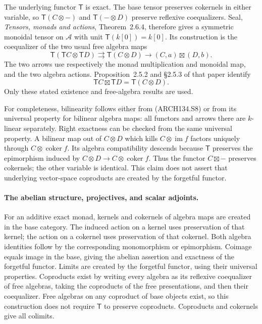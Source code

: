The underlying functor $\mathsf T$ is exact.  The base tensor
preserves cokernels in either variable, so
$\mathsf T(C\otimes-)$ and $\mathsf T(-\otimes D)$ preserve
reflexive coequalizers.  Seal, \emph{Tensors, monads and actions},
Theorem~2.6.4, therefore gives a symmetric monoidal tensor on
$\mathcal A$ with unit $\mathsf T(k[0])=k[0]$.
Its construction is the coequalizer of the two usual free
algebra maps
\[
 \mathsf T(\mathsf T C\otimes\mathsf T D)
       \rightrightarrows\mathsf T(C\otimes D)
       \longrightarrow (C,a)\boxtimes(D,b).
 \tag{ARCH134.S8}
\]
The two arrows use respectively the monad multiplication and
monoidal map, and the two algebra actions.  Proposition~2.5.2
and \S2.5.3 of that paper identify
\[
        \mathsf T C\boxtimes\mathsf T D
                         =\mathsf T(C\otimes D).
 \tag{ARCH134.S9}
\]
Only these stated existence and free-algebra results are used.

For completeness, bilinearity follows either from (ARCH134.S8)
or from its universal property for bilinear algebra maps:
all functors and arrows there are $k$-linear separately.
Right exactness can be checked from the same universal property.
A bilinear map out of $C\otimes D$ which kills
$C\otimes\operatorname{im}f$ factors uniquely through
$C\otimes\operatorname{coker}f$.  Its algebra compatibility
descends because $\mathsf T$ preserves the epimorphism induced
by $C\otimes D\to C\otimes\operatorname{coker}f$.
Thus the functor $C\boxtimes-$ preserves cokernels; the other
variable is identical.  This claim does not assert that
underlying vector-space coproducts are created by the forgetful
functor.

\paragraph{The abelian structure, projectives, and scalar adjoints.}
For an additive exact monad, kernels and cokernels of algebra
maps are created in the base category.  The induced action on
a kernel uses preservation of that kernel; the action on a
cokernel uses preservation of that cokernel.  Both algebra
identities follow by the corresponding monomorphism or
epimorphism.  Coimage equals image in the base, giving the
abelian assertion and exactness of the forgetful functor.
Limits are created by the forgetful functor, using their
universal properties.  Coproducts exist by writing every
algebra as its reflexive coequalizer of free algebras, taking
the coproducts of the free presentations, and then their
coequalizer.  Free algebras on any coproduct of base objects
exist, so this construction does not require $\mathsf T$ to
preserve coproducts.  Coproducts and cokernels give all colimits.

